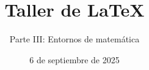 
\title{Taller de \LaTeX}
\subtitle{Parte III: Entornos de matemática}
\date{6 de septiembre de 2025}

\usepackage[short]{optidef}
\usepackage{diffcoeff}
\providecommand\relphantom[1]{\mathrel{\phantom{#1}}}
\providecommand\ve{\varepsilon}
\providecommand\tve{t_{\varepsilon}}
\providecommand\vf{\varphi}
\providecommand\yvf{y_{\varphi}}
\providecommand\bfE{\mathbf{E}}










